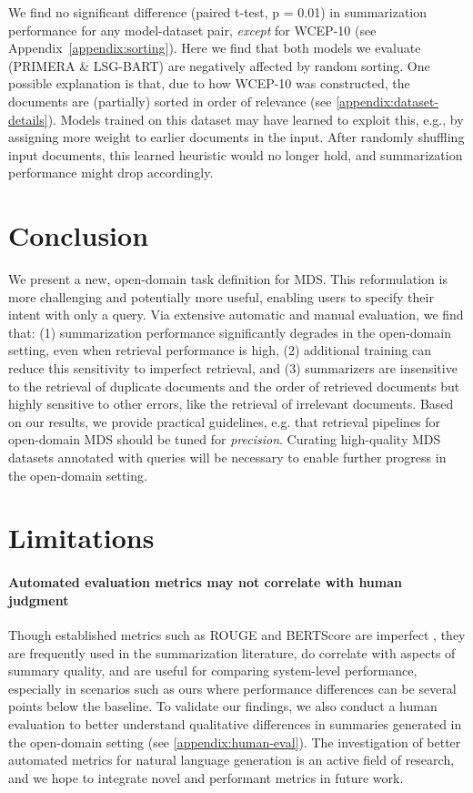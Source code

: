 \documentclass[11pt]{article}
\begin{document}
\noindent We find no significant difference (paired t-test, p = 0.01) in summarization performance for any model-dataset pair, \textit{except} for WCEP-10 (see Appendix~\ref{appendix:sorting}). Here we find that both models we evaluate (PRIMERA \& LSG-BART) are negatively affected by random sorting. One possible explanation is that, due to how WCEP-10 was constructed, the documents are (partially) sorted in order of relevance (see \autoref{appendix:dataset-details}). Models trained on this dataset may have learned to exploit this, e.g., by assigning more weight to earlier documents in the input. After randomly shuffling input documents, this learned heuristic would no longer hold, and summarization performance might drop accordingly.

\vspace{-1.0mm}
\section{Conclusion}
\vspace{-1.0mm}

We present a new, open-domain task definition for MDS. This reformulation is more challenging and potentially more useful, enabling users to specify their intent with only a query. Via extensive automatic and manual evaluation, we find that: (1) summarization performance significantly degrades in the open-domain setting, even when retrieval performance is high, (2) additional training can reduce this sensitivity to imperfect retrieval, and (3) summarizers are insensitive to the retrieval of duplicate documents and the order of retrieved documents but highly sensitive to other errors, like the retrieval of irrelevant documents. Based on our results, we provide practical guidelines, e.g. that retrieval pipelines for open-domain MDS should be tuned for \textit{precision}. Curating high-quality MDS datasets annotated with queries will be necessary to enable further progress in the open-domain setting.

\section*{Limitations} \label{limitations}

\paragraph{Automated evaluation metrics may not correlate with human judgment}
Though established metrics such as ROUGE and BERTScore are imperfect \citep{deutsch-etal-2022-examining}, they are frequently used in the summarization literature, do correlate with aspects of summary quality, and are useful for comparing system-level performance, especially in scenarios such as ours where performance differences can be several points below the baseline. To validate our findings, we also conduct a human evaluation to better understand qualitative differences in summaries generated in the open-domain setting (see \autoref{appendix:human-eval}). The investigation of better automated metrics for natural language generation is an active field of research, and we hope to integrate novel and performant metrics in future work.
\end{document}
